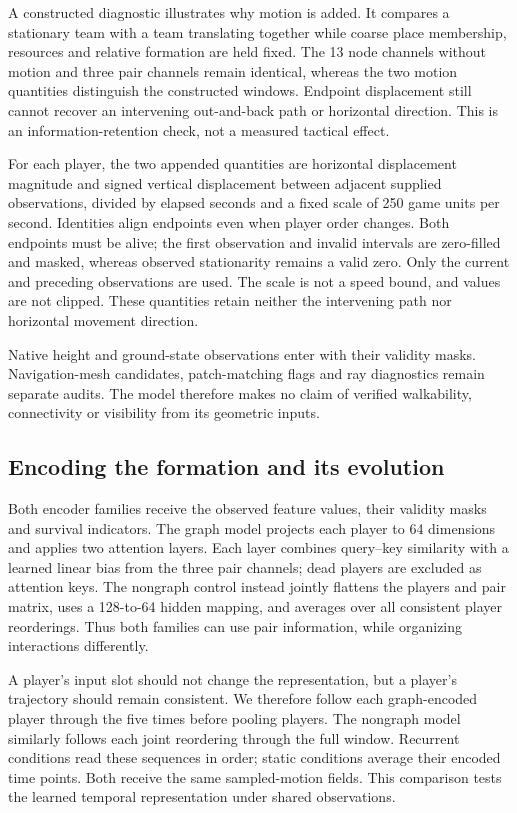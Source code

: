 A constructed diagnostic illustrates why motion is added. It compares a stationary team with a team translating together while coarse place membership, resources and relative formation are held fixed. The 13 node channels without motion and three pair channels remain identical, whereas the two motion quantities distinguish the constructed windows. Endpoint displacement still cannot recover an intervening out-and-back path or horizontal direction. This is an information-retention check, not a measured tactical effect. %

For each player, the two appended quantities are horizontal displacement magnitude and signed vertical displacement between adjacent supplied observations, divided by elapsed seconds and a fixed scale of 250 game units per second. Identities align endpoints even when player order changes. Both endpoints must be alive; the first observation and invalid intervals are zero-filled and masked, whereas observed stationarity remains a valid zero. Only the current and preceding observations are used. The scale is not a speed bound, and values are not clipped. These quantities retain neither the intervening path nor horizontal movement direction. %

Native height and ground-state observations enter with their validity masks. Navigation-mesh candidates, patch-matching flags and ray diagnostics remain separate audits. The model therefore makes no claim of verified walkability, connectivity or visibility from its geometric inputs. %

\subsection{Encoding the formation and its evolution}
Both encoder families receive the observed feature values, their validity masks and survival indicators. The graph model projects each player to 64 dimensions and applies two attention layers. Each layer combines query--key similarity with a learned linear bias from the three pair channels; dead players are excluded as attention keys. The nongraph control instead jointly flattens the players and pair matrix, uses a 128-to-64 hidden mapping, and averages over all consistent player reorderings. Thus both families can use pair information, while organizing interactions differently. %

A player's input slot should not change the representation, but a player's trajectory should remain consistent. We therefore follow each graph-encoded player through the five times before pooling players. The nongraph model similarly follows each joint reordering through the full window. Recurrent conditions read these sequences in order; static conditions average their encoded time points. Both receive the same sampled-motion fields. This comparison tests the learned temporal representation under shared observations.

